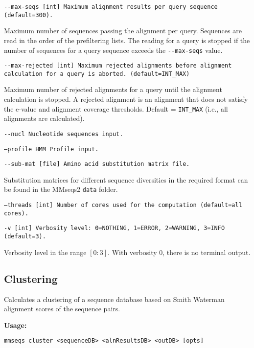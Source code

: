 \documentclass[11pt,a4paper]{scrreprt}
\begin{document}
\texttt{\small -{}-max-seqs {[}int{]} Maximum alignment results per query sequence (default=300).}{\small \par}


Maximum number of sequences passing the alignment per query. Sequences are read in the order of the prefiltering lists. The reading for a query is stopped if the number of sequences for a query sequence exceeds the \texttt{-{}-max-seqs} value.


\texttt{\small -{}-max-rejected {[}int{]} Maximum rejected alignments before alignment calculation for a query is aborted. (default=INT\_MAX)}{\small \par}


Maximum number of rejected alignments for a query until the alignment calculation is stopped. A rejected alignment is an alignment that does not satisfy the e-value and alignment coverage thresholds. Default = \texttt{INT\_MAX} (i.e., all alignments are calculated).


\texttt{\small -{}-nucl Nucleotide sequences input.}{\small \par}


\texttt{\small --profile HMM Profile input.}{\small \par}


\texttt{\small -{}-sub-mat {[}file{]} Amino acid substitution matrix file.}{\small \par}


Substitution matrices for different sequence diversities in the required format can be found in the MMseqs2 \texttt{data} folder.


\texttt{\small --threads {[}int{]} Number of cores used for the computation (default=all cores).}{\small \par}


\texttt{\small -v {[}int{]} Verbosity level: 0=NOTHING, 1=ERROR, 2=WARNING, 3=INFO (default=3).}{\small \par}


Verbosity level in the range $[0:3]$. With verbosity $0$, there is no terminal output.
\subsection{Clustering}
Calculates a clustering of a sequence database based on Smith Waterman alignment scores of the sequence pairs.


\textbf{Usage:}


\texttt{mmseqs cluster <sequenceDB> <alnResultsDB> <outDB> {[}opts{]}}
\end{document}
